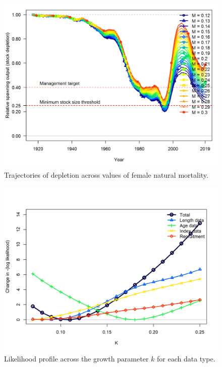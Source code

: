 \documentclass[12pt,]{article}
\begin{document}
\FloatBarrier

\begin{figure}
\centering
\includegraphics{Figures/profile_m_depl.png}
\caption{Trajectories of depletion across values of female natural
mortality. \label{fig:profile_m_depl}}
\end{figure}

\FloatBarrier

\begin{figure}
\centering
\includegraphics{Figures/profile_k_like.png}
\caption{Likelihood profile across the growth parameter \(k\) for each
data type. \label{fig:profile_k_like}}
\end{figure}
\end{document}
